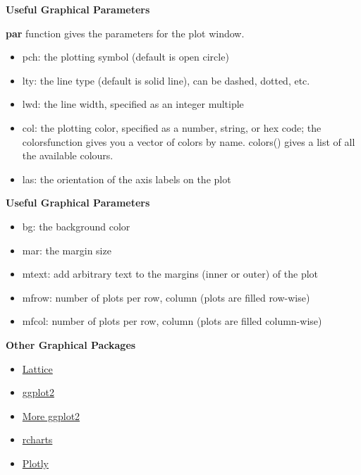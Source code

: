 \documentclass[xcolor=dvipsnames , 11pt]{beamer}
\begin{document}
\begin{frame}[fragile]{\textbf{Useful Graphical Parameters}}

\textbf{par} function gives the parameters for the plot window.
\begin{itemize}
\item pch: the plotting symbol (default is open circle)
\item lty: the line type (default is solid line), can be dashed, dotted, etc.
\item lwd: the line width, specified as an integer multiple
\item col: the plotting color, specified as a number, string, or hex code; the colorsfunction gives you a vector of colors by name. colors() gives a list of all the available colours.
\item las: the orientation of the axis labels on the plot
\end{itemize}
\end{frame}

\begin{frame}[fragile]{\textbf{Useful Graphical Parameters}}


\begin{itemize}
\item bg: the background color
\item mar: the margin size
\item mtext: add arbitrary text to the margins (inner or outer) of the plot
\item mfrow: number of plots per row, column (plots are filled row-wise)
\item mfcol: number of plots per row, column (plots are filled column-wise)
\end{itemize}
\end{frame}



\begin{frame}[fragile]{\textbf{Other Graphical Packages}}


\begin{itemize}
\item \href{http://www.r-bloggers.com/conditioning-and-grouping-with-lattice-graphics/}{Lattice}
\item \href{http://rstudio-pubs-static.s3.amazonaws.com/5051_39c30acbb432498fa1a290f166c6b403.html}{ggplot2}
\item \href{http://docs.ggplot2.org/current/ }{More ggplot2}
\item  \href{http://rcharts.io/gallery/}{rcharts}
\item \href{https://plot.ly/feed/}{Plotly}
\end{itemize}
\end{frame}
\end{document}
